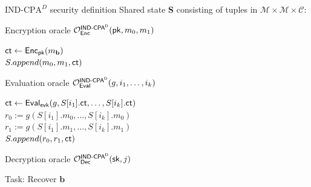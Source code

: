 \documentclass{beamer}
\begin{document}
		\begin{frame}{$\text{IND-CPA}^D$ security definition}
		\vspace*{-0.3cm}
		Shared state \textbf{S} consisting of tuples in $\mathcal{M} \times \mathcal{M} \times \mathcal{C}$:
		\begin{algorithm}[H]
			\scriptsize
			\caption{Encryption oracle ${\mathcal O}_{\sf Enc}^\text{\sf IND-CPA$\sf ^D$}({\sf pk}, m_0, m_1)$}
			$\mathsf{ct} \gets {\sf Enc}_{{\sf pk}}(m_\mathbf{b})$\\
			$S.append(m_0, m_1, \mathsf{ct})$\\
			\Return{$\ct$}
		\end{algorithm}
		\begin{algorithm}[H]
			\scriptsize
			\caption{Evaluation oracle ${\mathcal O}_{\mathsf{Eval}}^\text{\sf IND-CPA$\sf ^D$}(g, i_1, \dots, i_k)$}
			$\mathsf{ct} \gets \mathsf{Eval}_{{\sf evk}}(g, S[i_1].\mathsf{ct}, \dots, S[i_k].\mathsf{ct})$\\
			$r_0 := g(S[i_1].m_0, \dots, S[i_k].m_0)$\\
			$r_1 := g(S[i_1].m_1, \dots, S[i_k].m_1)$\\
			$S.append(r_0, r_1, \mathsf{ct})$\\
			\Return{$\ct$}
		\end{algorithm}
		
		\begin{algorithm}[H]
			\scriptsize
			\caption{Decryption oracle ${\mathcal O}_{\sf Dec}^\text{\sf IND-CPA$\sf ^D$}({\sf sk}, j)$}
		\end{algorithm}
		Task: Recover $\mathbf{b}$
	\end{frame}
\end{document}
